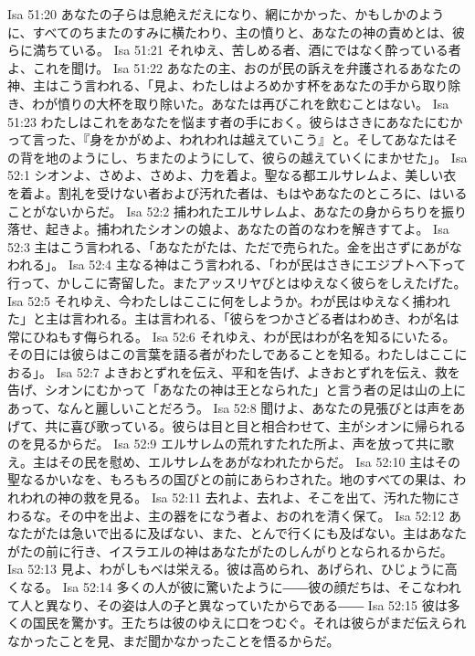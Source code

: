 Isa 51:20  あなたの子らは息絶えだえになり、網にかかった、かもしかのように、すべてのちまたのすみに横たわり、主の憤りと、あなたの神の責めとは、彼らに満ちている。
Isa 51:21  それゆえ、苦しめる者、酒にではなく酔っている者よ、これを聞け。
Isa 51:22  あなたの主、おのが民の訴えを弁護されるあなたの神、主はこう言われる、「見よ、わたしはよろめかす杯をあなたの手から取り除き、わが憤りの大杯を取り除いた。あなたは再びこれを飲むことはない。
Isa 51:23  わたしはこれをあなたを悩ます者の手におく。彼らはさきにあなたにむかって言った、『身をかがめよ、われわれは越えていこう』と。そしてあなたはその背を地のようにし、ちまたのようにして、彼らの越えていくにまかせた」。
Isa 52:1  シオンよ、さめよ、さめよ、力を着よ。聖なる都エルサレムよ、美しい衣を着よ。割礼を受けない者および汚れた者は、もはやあなたのところに、はいることがないからだ。
Isa 52:2  捕われたエルサレムよ、あなたの身からちりを振り落せ、起きよ。捕われたシオンの娘よ、あなたの首のなわを解きすてよ。
Isa 52:3  主はこう言われる、「あなたがたは、ただで売られた。金を出さずにあがなわれる」。
Isa 52:4  主なる神はこう言われる、「わが民はさきにエジプトへ下って行って、かしこに寄留した。またアッスリヤびとはゆえなく彼らをしえたげた。
Isa 52:5  それゆえ、今わたしはここに何をしようか。わが民はゆえなく捕われた」と主は言われる。主は言われる、「彼らをつかさどる者はわめき、わが名は常にひねもす侮られる。
Isa 52:6  それゆえ、わが民はわが名を知るにいたる。その日には彼らはこの言葉を語る者がわたしであることを知る。わたしはここにおる」。
Isa 52:7  よきおとずれを伝え、平和を告げ、よきおとずれを伝え、救を告げ、シオンにむかって「あなたの神は王となられた」と言う者の足は山の上にあって、なんと麗しいことだろう。
Isa 52:8  聞けよ、あなたの見張びとは声をあげて、共に喜び歌っている。彼らは目と目と相合わせて、主がシオンに帰られるのを見るからだ。
Isa 52:9  エルサレムの荒れすたれた所よ、声を放って共に歌え。主はその民を慰め、エルサレムをあがなわれたからだ。
Isa 52:10  主はその聖なるかいなを、もろもろの国びとの前にあらわされた。地のすべての果は、われわれの神の救を見る。
Isa 52:11  去れよ、去れよ、そこを出て、汚れた物にさわるな。その中を出よ、主の器をになう者よ、おのれを清く保て。
Isa 52:12  あなたがたは急いで出るに及ばない、また、とんで行くにも及ばない。主はあなたがたの前に行き、イスラエルの神はあなたがたのしんがりとなられるからだ。
Isa 52:13  見よ、わがしもべは栄える。彼は高められ、あげられ、ひじょうに高くなる。
Isa 52:14  多くの人が彼に驚いたように――彼の顔だちは、そこなわれて人と異なり、その姿は人の子と異なっていたからである――
Isa 52:15  彼は多くの国民を驚かす。王たちは彼のゆえに口をつむぐ。それは彼らがまだ伝えられなかったことを見、まだ聞かなかったことを悟るからだ。
